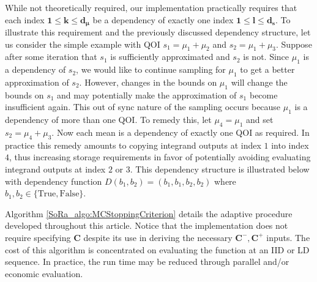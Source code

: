 \documentclass[graybox]{svmult}
\begin{document}
While not theoretically required, our implementation practically requires that each index $\boldsymbol{1} \leq \boldsymbol{k} \leq \boldsymbol{d}_{\boldsymbol{\mu}}$ be a dependency of exactly one index $\boldsymbol{1} \leq \boldsymbol{l} \leq \boldsymbol{d}_{\boldsymbol{s}}$. To illustrate this requirement and the previously discussed dependency structure, let us consider the simple example with QOI $s_1 = \mu_1 + \mu_2$ and $s_2 = \mu_1 + \mu_3$. Suppose after some iteration that $s_1$ is sufficiently approximated and $s_2$ is not. Since $\mu_1$ is a dependency of $s_2$, we would like to continue sampling for $\mu_1$ to get a better approximation of $s_2$. However, changes in the bounds on $\mu_1$ will change the bounds on $s_1$ and may potentially make the approximation of $s_1$ become insufficient again. This out of sync nature of the sampling occurs because $\mu_1$ is a dependency of more than one QOI. To remedy this, let $\mu_4 = \mu_1$ and set $s_2 = \mu_4 + \mu_3$. Now each mean is a dependency of exactly one QOI as required. In practice this remedy amounts to copying integrand outputs at index $1$ into index $4$, thus increasing storage requirements in favor of potentially avoiding evaluating integrand outputs at index $2$ or $3$. This dependency structure is illustrated below with dependency function $D(b_1,b_2) = (b_1,b_1,b_2,b_2)$ where $b_1,b_2 \in \{\text{True},\text{False}\}$. 

\begin{figure}
    \centering
{}
\end{figure}

Algorithm \ref{SoRa_algo:MCStoppingCriterion} details the adaptive procedure developed throughout this article. Notice that the implementation does not require specifying $\boldsymbol{C}$ despite its use in deriving the necessary $\boldsymbol{C}^-,\boldsymbol{C}^+$ inputs. The cost of this algorithm is concentrated on evaluating the function at an IID or LD sequence. In practice, the run time may be reduced through parallel and/or economic evaluation.
\end{document}
